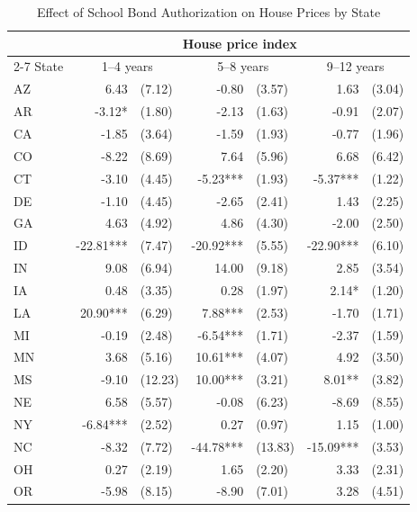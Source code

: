\begin{table}[htbp]
    \centering
    \caption{Effect of School Bond Authorization on House Prices by State}
    \label{tab:state_house_prices}
    \begin{threeparttable}
    \begin{tabular}{l*{3}{r@{\hspace{3pt}}l}}
    \toprule
    & \multicolumn{6}{c}{House price index} \\
    \cmidrule(lr){2-7}
    State & \multicolumn{2}{c}{1--4 years} & \multicolumn{2}{c}{5--8 years} & \multicolumn{2}{c}{9--12 years} \\
    \midrule
    AZ & 6.43 & (7.12) & -0.80 & (3.57) & 1.63 & (3.04) \\
    AR & -3.12* & (1.80) & -2.13 & (1.63) & -0.91 & (2.07) \\
    CA & -1.85 & (3.64) & -1.59 & (1.93) & -0.77 & (1.96) \\
    CO & -8.22 & (8.69) & 7.64 & (5.96) & 6.68 & (6.42) \\
    CT & -3.10 & (4.45) & -5.23*** & (1.93) & -5.37*** & (1.22) \\
    DE & -1.10 & (4.45) & -2.65 & (2.41) & 1.43 & (2.25) \\
    GA & 4.63 & (4.92) & 4.86 & (4.30) & -2.00 & (2.50) \\
    ID & -22.81*** & (7.47) & -20.92*** & (5.55) & -22.90*** & (6.10) \\
    IN & 9.08 & (6.94) & 14.00 & (9.18) & 2.85 & (3.54) \\
    IA & 0.48 & (3.35) & 0.28 & (1.97) & 2.14* & (1.20) \\
    LA & 20.90*** & (6.29) & 7.88*** & (2.53) & -1.70 & (1.71) \\
    MI & -0.19 & (2.48) & -6.54*** & (1.71) & -2.37 & (1.59) \\
    MN & 3.68 & (5.16) & 10.61*** & (4.07) & 4.92 & (3.50) \\
    MS & -9.10 & (12.23) & 10.00*** & (3.21) & 8.01** & (3.82) \\
    NE & 6.58 & (5.57) & -0.08 & (6.23) & -8.69 & (8.55) \\
    NY & -6.84*** & (2.52) & 0.27 & (0.97) & 1.15 & (1.00) \\
    NC & -8.32 & (7.72) & -44.78*** & (13.83) & -15.09*** & (3.53) \\
    OH & 0.27 & (2.19) & 1.65 & (2.20) & 3.33 & (2.31) \\
    OR & -5.98 & (8.15) & -8.90 & (7.01) & 3.28 & (4.51) \\

\end{tabular}
\end{threeparttable}
\end{table}
